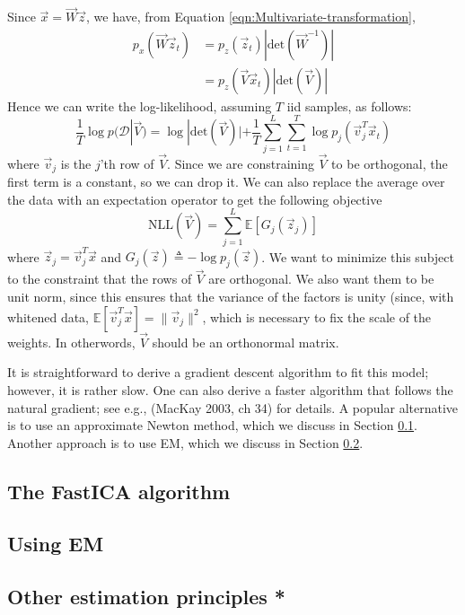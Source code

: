 Since $\vec{x}=\vec{W}\vec{z}$, we have, from Equation \ref{eqn:Multivariate-transformation},
\begin{align}
p_x(\vec{W}\vec{z}_t) & =p_z(\vec{z}_t)|\mathrm{det}(\vec{W}^{-1})| \nonumber \\
   & = p_z(\vec{V}\vec{x}_t)|\mathrm{det}(\vec{V})|
\end{align}
Hence we can write the log-likelihood, assuming $T$ iid samples, as follows:
\begin{equation*}
\frac{1}{T} \log p(\mathcal{D}|\vec{V})=\log|\mathrm{det}(\vec{V})|+\frac{1}{T}\sum\limits_{j=1}^L \sum\limits_{t=1}^T \log p_j(\vec{v}_j^T\vec{x}_t)
\end{equation*}
where $\vec{v}_j$ is the $j$'th row of $\vec{V}$. Since we are constraining $\vec{V}$ to be orthogonal, the first term is a constant, so we can drop it. We can also replace the average over the data with an expectation operator to get the following objective
\begin{equation}
\mathrm{NLL}(\vec{V})=\sum\limits_{j=1}^L \mathbb{E}[G_j(\vec{z}_j)]
\end{equation}
where $\vec{z}_j=\vec{v}_j^T\vec{x}$ and $G_j(\vec{z}) \triangleq -\log p_j(\vec{z})$. We want to minimize this subject to the constraint that the rows of $\vec{V}$ are orthogonal. We also want them to be unit norm, since this ensures that the variance of the factors is unity (since, with whitened data, $\mathbb{E}[\vec{v}_j^T\vec{x}]=\lVert \vec{v}_j \rVert^2$, which is necessary to fix the scale of the weights. In otherwords, $\vec{V}$ should be an orthonormal matrix.

It is straightforward to derive a gradient descent algorithm to fit this model; however, it is rather slow. One can also derive a faster algorithm that follows the natural gradient; see e.g., (MacKay 2003, ch 34) for details. A popular alternative is to use an approximate Newton method, which we discuss in Section \ref{sec:FastICA}. Another approach is to use EM, which we discuss in Section \ref{sec:ICA-EM}.


\subsection{The FastICA algorithm}
\label{sec:FastICA}


\subsection{Using EM}
\label{sec:ICA-EM}


\subsection{Other estimation principles *}

